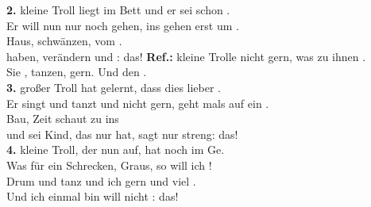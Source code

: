 

\textbf{2.} kleine Troll liegt  im Bett und  er sei schon .\\
Er will nun nur noch  gehen, ins  gehen erst um .\\
Haus,  schwänzen,   vom .\\
 haben,  verändern und  :  das!
\textbf{Ref.:}  kleine Trolle  nicht gern, was  zu ihnen .\\
Sie , tanzen,  gern. Und  den  .\\[0.5em]
\textbf{3.}  großer Troll hat  gelernt, dass  dies lieber .\\
Er singt und tanzt und  nicht gern, geht mals auf ein .\\
Bau,  Zeit schaut  zu  ins  \\
und sei Kind, das  nur hat, sagt  nur  streng:  das!\\[0.5em]
\textbf{4.}  kleine Troll, der  nun auf, hat  noch im Ge.\\
Was für ein Schrecken,  Graus, so  will ich ! \\
Drum  und tanz und  ich gern und   viel . \\
Und  ich einmal  bin will  nicht :  das!
